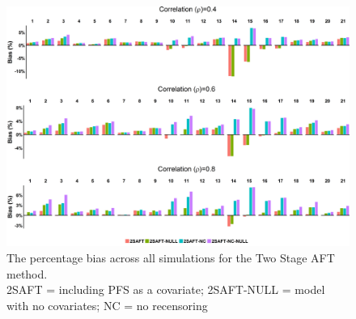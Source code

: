 \begin{figure}
    \centering
    \includegraphics[width=20cm]{images/app_allres/saft_bias4.png}
    \caption{The percentage bias across all simulations for the Two Stage AFT method. \\ 2SAFT = including PFS as a covariate; 2SAFT-NULL = model with no covariates; NC = no recensoring}
    \label{F:allp:saft}
\end{figure}
